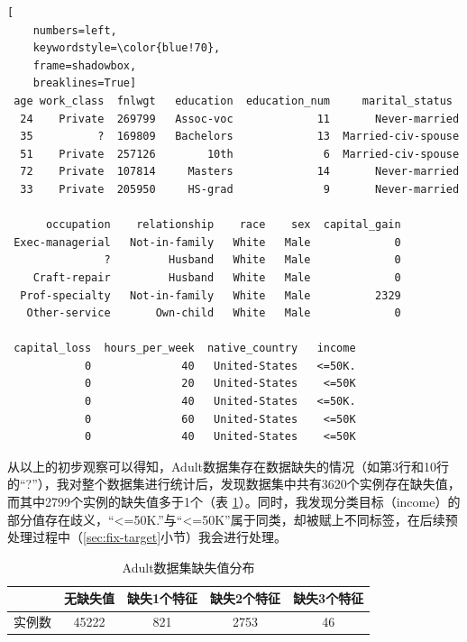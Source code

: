 \documentclass[12pt,a4paper]{article}
\theoremstyle{definition}
\begin{document}
\vspace{0.015\linewidth}
	\begin{lstlisting}[
	numbers=left,
	keywordstyle=\color{blue!70},
	frame=shadowbox,
	breaklines=True]
 age work_class  fnlwgt   education  education_num     marital_status
  24    Private  269799   Assoc-voc             11       Never-married   
  35          ?  169809   Bachelors             13  Married-civ-spouse   
  51    Private  257126        10th              6  Married-civ-spouse   
  72    Private  107814     Masters             14       Never-married   
  33    Private  205950     HS-grad              9       Never-married   

      occupation    relationship    race    sex  capital_gain
 Exec-managerial   Not-in-family   White   Male             0   
               ?         Husband   White   Male             0   
    Craft-repair         Husband   White   Male             0   
  Prof-specialty   Not-in-family   White   Male          2329   
   Other-service       Own-child   White   Male             0   

 capital_loss  hours_per_week  native_country   income  
            0              40   United-States   <=50K.  
            0              20   United-States    <=50K
            0              40   United-States   <=50K.  
            0              60   United-States    <=50K  
            0              40   United-States    <=50K   
	\end{lstlisting}
	
\vspace{0.02\linewidth}
从以上的初步观察可以得知，Adult数据集存在数据缺失的情况（如第3行和10行的“?”），我对整个数据集进行统计后，发现数据集中共有3620个实例存在缺失值，而其中2799个实例的缺失值多于1个（表 \ref{tab:nan}）。同时，我发现分类目标（income）的部分值存在歧义，“<=50K.”与“<=50K”属于同类，却被赋上不同标签，在后续预处理过程中（\ref{sec:fix-target}小节）我会进行处理。

\begin{table}[H]
	\renewcommand\arraystretch{1.35}
	\caption{Adult数据集缺失值分布}
	\label{tab:nan}
	\centering
	
	\begin{tabular}{c|c|c|c|c}
		\centering
		 & 无缺失值 & 缺失1个特征 & 缺失2个特征 & 缺失3个特征 \\
		\hline

		实例数 & 45222 & 821 & 2753 & 46 \\

	\end{tabular}
\end{table}
\end{document}

